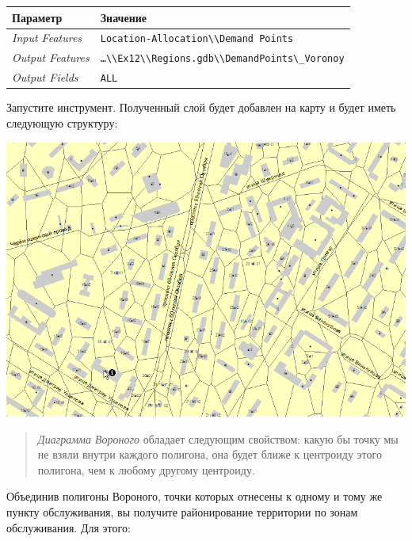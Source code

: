 \documentclass[]{book}
\theoremstyle{definition}
\theoremstyle{definition}
\theoremstyle{definition}
\theoremstyle{remark}
\begin{document}
\begin{enumerate}
  \begin{longtable}[]{@{}ll@{}}
  \toprule
  Параметр & Значение\tabularnewline
  \midrule
  \endhead
  \emph{Input Features} &
  \texttt{Location-Allocation\textbackslash{}\textbackslash{}Demand\ Points}\tabularnewline
  \emph{Output Features} &
  \texttt{\ldots{}\textbackslash{}\textbackslash{}Ex12\textbackslash{}\textbackslash{}Regions.gdb\textbackslash{}\textbackslash{}DemandPoints\textbackslash{}\_Voronoy}\tabularnewline
  \emph{Output Fields} & \texttt{ALL}\tabularnewline
  \bottomrule
  \end{longtable}

  Запустите инструмент. Полученный слой будет добавлен на карту и будет
  иметь следующую структуру:

  \includegraphics{images/Ex12/image30.png}
\end{enumerate}

\begin{quote}
\emph{Диаграмма Вороного} обладает следующим свойством: какую бы точку
мы не взяли внутри каждого полигона, она будет ближе к центроиду этого
полигона, чем к любому другому центроиду.
\end{quote}

Объединив полигоны Вороного, точки которых отнесены к одному и тому же
пункту обслуживания, вы получите районирование территории по зонам
обслуживания. Для этого:
\end{document}

